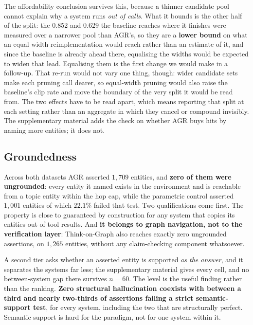 The affordability conclusion survives this, because a thinner candidate
pool cannot explain why a system runs \emph{out of calls}. What it
bounds is the other half of the split: the $0.852$ and $0.629$ the
baseline reaches where it finishes were measured over a narrower pool
than AGR's, so they are a \textbf{lower bound} on what an equal-width
reimplementation would reach rather than an estimate of it, and since
the baseline is already ahead there, equalising the widths would be
expected to widen that lead. Equalising them is the first change we
would make in a follow-up. That re-run would not vary one thing, though:
wider candidate sets make each pruning call dearer, so equal-width
pruning would also raise the baseline's clip rate and move the boundary
of the very split it would be read from. The two effects have to be read
apart, which means reporting that split at each setting rather than an
aggregate in which they cancel or compound invisibly. The supplementary
material adds the check on whether AGR buys hits by naming more
entities; it does not.

\subsection{Groundedness}\label{sec:groundedness}

Across both datasets AGR asserted $1{,}709$ entities, and \textbf{zero
of them were ungrounded}: every entity it named exists in the
environment and is reachable from a topic entity within the hop cap,
while the parametric control asserted $1{,}001$ entities of which
$22.1\%$ failed that test. Two qualifications come first. The property
is close to guaranteed by construction for any system that copies its
entities out of tool results. And \textbf{it belongs to graph
navigation, not to the verification layer}: Think-on-Graph also reaches
exactly zero ungrounded assertions, on $1{,}265$ entities, without any
claim-checking component whatsoever.

A second tier asks whether an asserted entity is supported \emph{as the
answer}, and it separates the systems far less; the supplementary
material gives every cell, and no between-system gap there survives $n =
60$. The level is the useful finding rather than the ranking.
\textbf{Zero structural hallucination coexists with between a third and
nearly two-thirds of assertions failing a strict semantic-support test},
for every system, including the two that are structurally perfect.
Semantic support is hard for the paradigm, not for one system within it.
